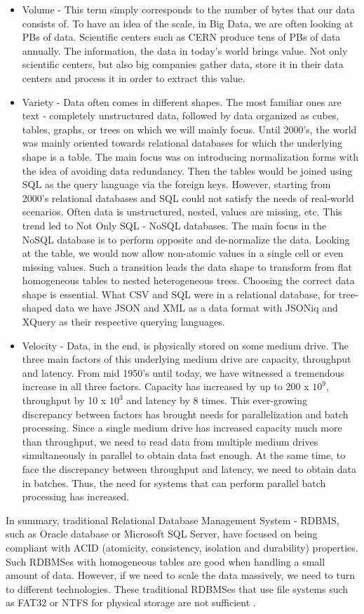 \begin{itemize}
	\item Volume - This term simply corresponds to the number of bytes that our data consists of. To have an idea of the scale, in Big Data, we are often looking at PBs of data. Scientific centers such as CERN produce tens of PBs of data annually. The information, the data in today's world brings value. Not only scientific centers, but also big companies gather data, store it in their data centers and process it in order to extract this value.
	\item Variety - Data often comes in different shapes. The most familiar ones are text - completely unstructured data, followed by data organized as cubes, tables, graphs, or trees on which we will mainly focus. Until 2000's, the world was mainly oriented towards relational databases for which the underlying shape is a table. The main focus was on introducing normalization forms with the idea of avoiding data redundancy. Then the tables would be joined using SQL as the query language via the foreign keys. However, starting from 2000's relational databases and SQL could not satisfy the needs of real-world scenarios. Often data is unstructured, nested, values are missing, etc. This trend led to Not Only SQL - NoSQL databases. The main focus in the NoSQL database is to perform opposite and de-normalize the data. Looking at the table, we would now allow non-atomic values in a single cell or even missing values. Such a transition leads the data shape to transform from flat homogeneous tables to nested heterogeneous trees. Choosing the correct data shape is essential. What CSV and SQL were in a relational database, for tree-shaped data we have JSON and XML as a data format with JSONiq and XQuery as their respective querying languages.
	\item Velocity - Data, in the end, is physically stored on some medium drive. The three main factors of this underlying medium drive are capacity, throughput and latency. From mid 1950's until today, we have witnessed a tremendous increase in all three factors. Capacity has increased by up to 200 x $10^9$, throughput by 10 x $10^3$  and latency by 8 times. This ever-growing discrepancy between factors has brought needs for parallelization and batch processing. Since a single medium drive has increased capacity much more than throughput, we need to read data from multiple medium drives simultaneously in parallel to obtain data fast enough. At the same time, to face the discrepancy between throughput and latency, we need to obtain data in batches. Thus, the need for systems that can perform parallel batch processing has increased.
\end{itemize}
In summary, traditional Relational Database Management System - RDBMS, such as Oracle database or Microsoft SQL Server, have focused on being compliant with ACID (atomicity, consistency, isolation and durability) properties. Such RDBMSes with homogeneous tables are good when handling a small amount of data. However, if we need to scale the data massively, we need to turn to different technologies. These traditional RDBMSes that use file systems such as FAT32 or NTFS for physical storage are not sufficient \cite{BigDataCourse}. %

